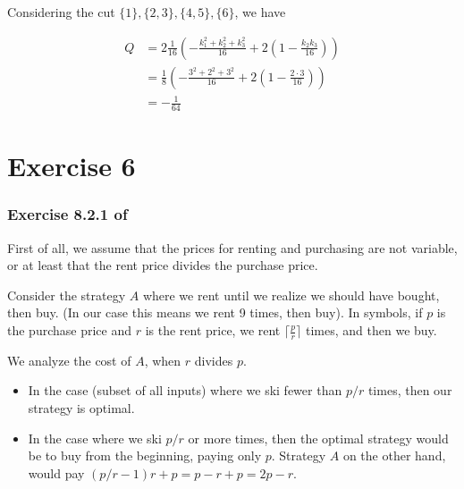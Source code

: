 \documentclass{article}
\begin{document}
Considering the cut \(\{1\}, \{2,3\}, \{4,5\}, \{6\}\), we have

\begin{align*}
    Q &= 2 \frac{1}{16}
        \left(
            -\frac{k_1^2 + k_2^2 + k_3^2}{16}
            + 2 \left( 1 - \frac{k_2 k_3}{16} \right)
         \right)\\
      &= \frac{1}{8}
      \left(
        -\frac{3^2 + 2^2 + 3^2}{16}
        + 2 \left( 1 - \frac{2 \cdot 3}{16} \right)
     \right)\\
     &= -\frac{1}{64}
\end{align*}


\section*{Exercise 6}

\subsubsection*{Exercise 8.2.1 of \cite{mmds}}


First of all, we assume that the prices
for renting and purchasing are not variable,
or at least that the rent price divides the purchase price.

Consider the strategy \(A\) where
we rent until we realize we should have bought, then buy.
(In our case this means we rent 9 times, then buy).
In symbols, if \(p\) is the purchase price and \(r\) is the rent price,
we rent \(\lceil \frac{p}{r} \rceil\) times, and then we buy.

We analyze the cost of \(A\), when \(r\) divides \(p\).

\begin{itemize}
    \item In the case (subset of all inputs) where we ski
        fewer than \(p / r\) times, then our strategy is optimal.
    \item In the case where we ski \(p / r\) or more times,
        then the optimal strategy would be to buy from the beginning,
        paying only \(p\).
        Strategy \(A\) on the other hand, would pay
        \((p/r - 1) r + p = p - r + p = 2p - r\).
\end{itemize}
\end{document}
